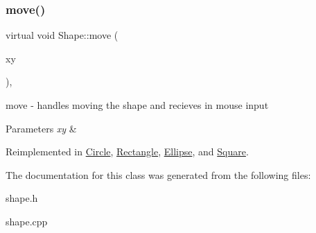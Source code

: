 \mbox{\label{class_shape_a26d57a0589b0fd7ff03a4b5ad8dc530a}} 
\subsubsection{\texorpdfstring{move()}{move()}}
{\footnotesize\ttfamily virtual void Shape\+::move (\begin{DoxyParamCaption}\item[{Q\+Point}]{xy }\end{DoxyParamCaption})\hspace{0.3cm}{\ttfamily [inline]}, {\ttfamily [virtual]}}



move -\/ handles moving the shape and recieves in mouse input 


\begin{DoxyParams}{Parameters}
{\em xy} & \\
\hline
\end{DoxyParams}


Reimplemented in \hyperlink{class_circle_a5f02de3ad7e992a689b9f9e88643076c}{Circle}, \hyperlink{class_rectangle_abeeafbc4d44bf241cf655e850f3ce3f3}{Rectangle}, \hyperlink{class_ellipse_a8f5c5a4d8051009fee6d861f163c96dd}{Ellipse}, and \hyperlink{class_square_a49d1e790212e18cb43d7647385cafa20}{Square}.



The documentation for this class was generated from the following files\+:\begin{DoxyCompactItemize}
\item 
shape.\+h\item 
shape.\+cpp\end{DoxyCompactItemize}
